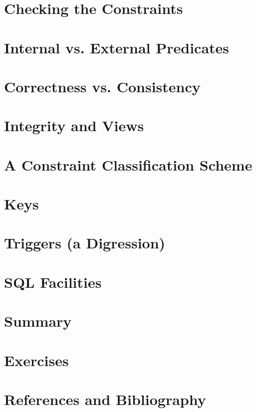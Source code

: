 \documentclass{book}
\begin{document}
\section{Checking the Constraints}

\section{Internal vs. External Predicates }

\section{Correctness vs. Consistency }

\section{Integrity and Views}

\section{A Constraint Classification Scheme}

\section{Keys}

\section{Triggers (a Digression)}

\section{SQL Facilities}

\section{Summary}

\section{Exercises}

\section{References and Bibliography}
\end{document}
